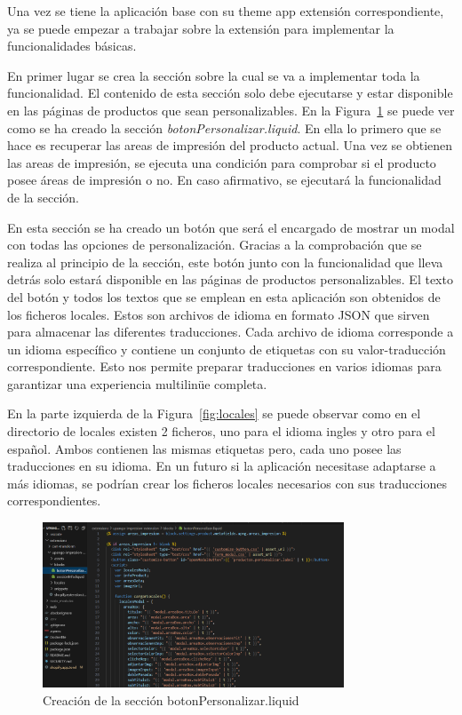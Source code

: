 \documentclass[12pt]{article}
\begin{document}
Una vez se tiene la aplicación base con su theme app extensión correspondiente, ya se puede empezar a trabajar sobre la extensión para implementar la funcionalidades básicas.

En primer lugar se crea la sección sobre la cual se va a implementar toda la funcionalidad. El contenido de esta sección solo debe ejecutarse y estar disponible en las 
páginas de productos que sean personalizables. En la Figura~\ref{fig:creacionSeccion} se puede ver como se ha creado la sección \textit{botonPersonalizar.liquid}. En ella lo primero
que se hace es recuperar las areas de impresión del producto actual. Una vez se obtienen las areas de impresión, se ejecuta una condición para comprobar
si el producto posee áreas de impresión o no. En caso afirmativo, se ejecutará la funcionalidad de la sección.

En esta sección se ha creado un botón que será el encargado de mostrar un modal con todas las opciones de personalización. Gracias a la comprobación
que se realiza al principio de la sección, este botón junto con la funcionalidad que lleva detrás solo estará disponible en las páginas de productos personalizables.
El texto del botón y todos los textos que se emplean en esta aplicación son obtenidos de los ficheros locales. Estos son archivos de idioma en formato 
JSON que sirven para almacenar las diferentes traducciones. Cada archivo de idioma corresponde a un idioma específico y contiene un conjunto de etiquetas con su valor-traducción correspondiente. Esto nos 
permite preparar traducciones en varios idiomas para garantizar una experiencia multilinüe completa.

En la parte izquierda de la Figura~\ref{fig:locales} se puede observar como en el directorio de locales existen 2 ficheros, uno para el idioma ingles y otro para el español. 
Ambos contienen las mismas etiquetas pero, cada uno posee las traducciones en su idioma. En un futuro si la aplicación necesitase adaptarse a más idiomas, se podrían crear los ficheros locales
necesarios con sus traducciones correspondientes.


\begin{figure}[ht]
    \centering
    \includegraphics[width=0.8\textwidth]{imagenesUS1/seccionPersonalizarBoton.png}
    \caption{\label{fig:creacionSeccion}Creación de la sección botonPersonalizar.liquid}
    \vspace{\fill}
\end{figure}
\end{document}
